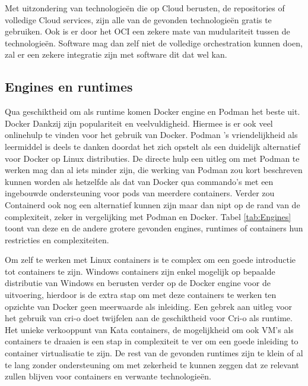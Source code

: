 Met uitzondering van technologieën die op Cloud berusten, de repositories of volledige Cloud services, zijn alle van de gevonden technologieën gratis te gebruiken. Ook is er door het OCI een zekere mate van mudulariteit tussen de technologieën. Software mag dan zelf niet de volledige orchestration kunnen doen, zal er een zekere integratie zijn met software dit dat wel kan.

\subsection{Engines en runtimes}
Qua geschiktheid om als runtime komen Docker engine en Podman het beste uit. Docker Dankzij zijn populariteit en veelvuldigheid. Hiermee is er ook veel onlinehulp te vinden voor het gebruik van Docker. Podman ’s vriendelijkheid als leermiddel is deels te danken doordat het zich opstelt als een duidelijk alternatief voor Docker op Linux distributies. De directe hulp een uitleg om met Podman te werken mag dan al iets minder zijn, die werking van Podman zou kort beschreven kunnen worden als hetzelfde als dat van Docker qua commando’s met een ingebouwde ondersteuning voor pods van meerdere containers.  Verder zou Containerd ook nog een alternatief kunnen zijn maar dan nipt op de rand van de complexiteit, zeker in vergelijking met Podman en Docker. Tabel \ref{tab:Engines} toont van deze en de andere grotere gevonden engines, runtimes of containers hun restricties en complexiteiten. 

Om zelf te werken met Linux containers is te complex om een goede introductie tot containers te zijn. Windows containers zijn enkel mogelijk op bepaalde distributie van Windows en berusten verder op de Docker engine voor de uitvoering, hierdoor is de extra stap om met deze containers te werken ten opzichte van Docker geen meerwaarde als inleiding. Een gebrek aan uitleg voor het gebruik van cri-o doet twijfelen aan de geschiktheid voor Cri-o als runtime.  Het unieke verkooppunt van Kata containers, de mogelijkheid om ook VM’s als containers te draaien is een stap in complexiteit te ver om een goede inleiding to container virtualisatie te zijn.  De rest van de gevonden runtimes zijn te klein of al te lang zonder ondersteuning om met zekerheid te kunnen zeggen dat ze relevant zullen blijven voor containers en verwante technologieën. 

